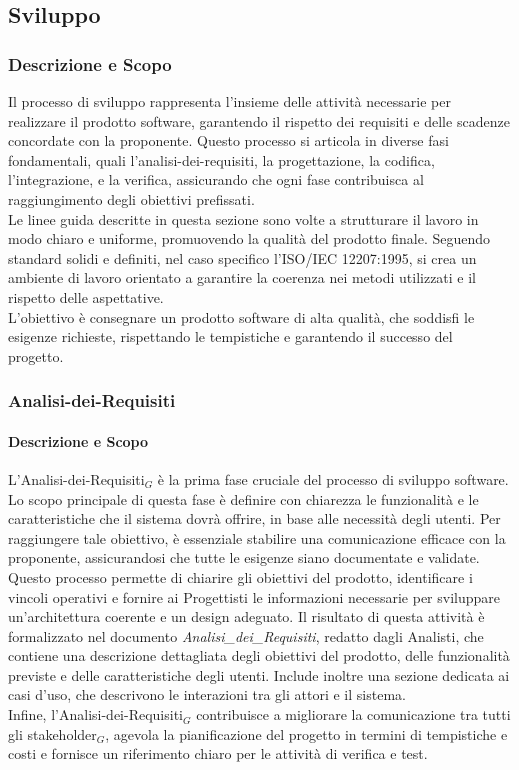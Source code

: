 \documentclass[10pt]{article}
\begin{document}
\begin{justify}
    \subsection{Sviluppo}

    \subsubsection{Descrizione e Scopo}
    Il processo di sviluppo rappresenta l'insieme delle attività necessarie per realizzare il prodotto software, garantendo il rispetto dei requisiti e delle scadenze concordate con la proponente. Questo processo si articola in diverse fasi fondamentali, quali l'analisi-dei-requisiti, la progettazione, la codifica, l'integrazione, e la verifica, assicurando che ogni fase contribuisca al raggiungimento degli obiettivi prefissati.\\
    Le linee guida descritte in questa sezione sono volte a strutturare il lavoro in modo chiaro e uniforme, promuovendo la qualità del prodotto finale. Seguendo standard solidi e definiti, nel caso specifico l'ISO/IEC 12207:1995, si crea un ambiente di lavoro orientato a garantire la coerenza nei metodi utilizzati e il rispetto delle aspettative.\\
    L'obiettivo è consegnare un prodotto software di alta qualità, che soddisfi le esigenze richieste, rispettando le tempistiche e garantendo il successo del progetto.\\

    \subsubsection{Analisi-dei-Requisiti}
    \label{analisi}
        \paragraph{Descrizione e Scopo}
        L'Analisi-dei-Requisiti$_G$ è la prima fase cruciale del processo di sviluppo software. Lo scopo principale di questa fase è definire con chiarezza le funzionalità e le caratteristiche che il sistema dovrà offrire, in base alle necessità degli utenti. Per raggiungere tale obiettivo, è essenziale stabilire una comunicazione efficace con la proponente, assicurandosi che tutte le esigenze siano documentate e validate. Questo processo permette di chiarire gli obiettivi del prodotto, identificare i vincoli operativi e fornire ai Progettisti le informazioni necessarie per sviluppare un'architettura coerente e un design adeguato. Il risultato di questa attività è formalizzato nel documento \textit{Analisi\_dei\_Requisiti}, redatto dagli Analisti, che contiene una descrizione dettagliata degli obiettivi del prodotto, delle funzionalità previste e delle caratteristiche degli utenti. Include inoltre una sezione dedicata ai casi d'uso, che descrivono le interazioni tra gli attori e il sistema.\\
        Infine, l'Analisi-dei-Requisiti$_G$ contribuisce a migliorare la comunicazione tra tutti gli stakeholder$_G$, agevola la pianificazione del progetto in termini di tempistiche e costi e fornisce un riferimento chiaro per le attività di verifica e test.\\


\end{justify}
\end{document}

